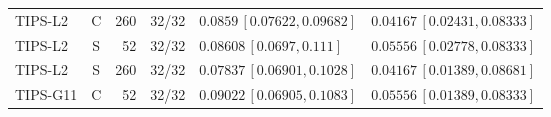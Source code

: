 \documentclass[10pt,a4paper]{article}
\begin{document}
\begin{longtable}{lcrcp{44mm}p{44mm}}
TIPS-L2 & C & 260 & 32/32 & \(0.0859\,[0.07622,0.09682]\) & \(0.04167\,[0.02431,0.08333]\)\\
TIPS-L2 & S & 52 & 32/32 & \(0.08608\,[0.0697,0.111]\) & \(0.05556\,[0.02778,0.08333]\)\\
TIPS-L2 & S & 260 & 32/32 & \(0.07837\,[0.06901,0.1028]\) & \(0.04167\,[0.01389,0.08681]\)\\
TIPS-G11 & C & 52 & 32/32 & \(0.09022\,[0.06905,0.1083]\) & \(0.05556\,[0.01389,0.08333]\)\\

\end{longtable}
\end{document}
